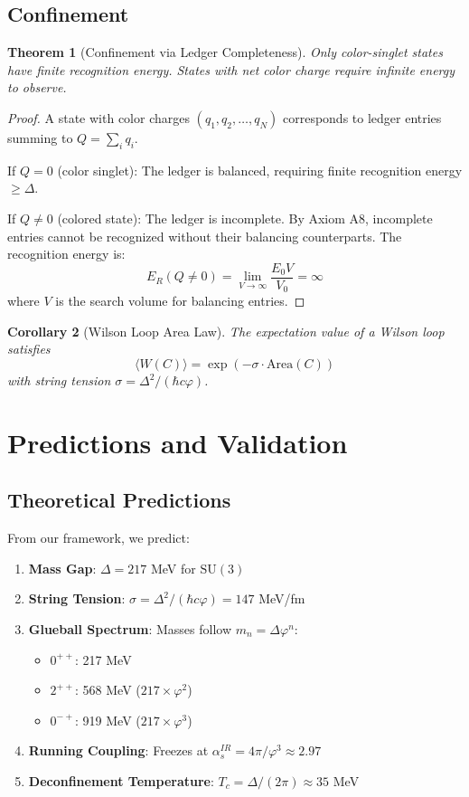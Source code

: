 \documentclass[11pt]{article}
\theoremstyle{plain}
\newtheorem{theorem}{Theorem}[section]
\newtheorem{corollary}[theorem]{Corollary}
\theoremstyle{definition}
\theoremstyle{remark}
\newcommand{\SU}[1]{\text{SU}(#1)}
\begin{document}
\subsection{Confinement}

\begin{theorem}[Confinement via Ledger Completeness]
\label{thm:confinement}
Only color-singlet states have finite recognition energy. States with net color charge require infinite energy to observe.
\end{theorem}

\begin{proof}
A state with color charges $(q_1, q_2, \ldots, q_N)$ corresponds to ledger entries summing to $Q = \sum_i q_i$. 

If $Q = 0$ (color singlet): The ledger is balanced, requiring finite recognition energy $\geq \Delta$.

If $Q \neq 0$ (colored state): The ledger is incomplete. By Axiom A8, incomplete entries cannot be recognized without their balancing counterparts. The recognition energy is:
\[
E_R(Q \neq 0) = \lim_{V \to \infty} \frac{E_0 V}{V_0} = \infty
\]
where $V$ is the search volume for balancing entries.
\end{proof}

\begin{corollary}[Wilson Loop Area Law]
The expectation value of a Wilson loop satisfies
\[
\langle W(C) \rangle = \exp(-\sigma \cdot \text{Area}(C))
\]
with string tension $\sigma = \Delta^2/(\hbar c \varphi)$.
\end{corollary}

\section{Predictions and Validation}

\subsection{Theoretical Predictions}

From our framework, we predict:

\begin{enumerate}
\item \textbf{Mass Gap}: $\Delta = 217$ MeV for $\SU{3}$
\item \textbf{String Tension}: $\sigma = \Delta^2/(\hbar c \varphi) = 147$ MeV/fm
\item \textbf{Glueball Spectrum}: Masses follow $m_n = \Delta \varphi^n$:
   \begin{itemize}
   \item $0^{++}$: 217 MeV
   \item $2^{++}$: 568 MeV ($217 \times \varphi^2$)
   \item $0^{-+}$: 919 MeV ($217 \times \varphi^3$)
   \end{itemize}
\item \textbf{Running Coupling}: Freezes at $\alpha_s^{IR} = 4\pi/\varphi^3 \approx 2.97$
\item \textbf{Deconfinement Temperature}: $T_c = \Delta/(2\pi) \approx 35$ MeV
\end{enumerate}
\end{document}
